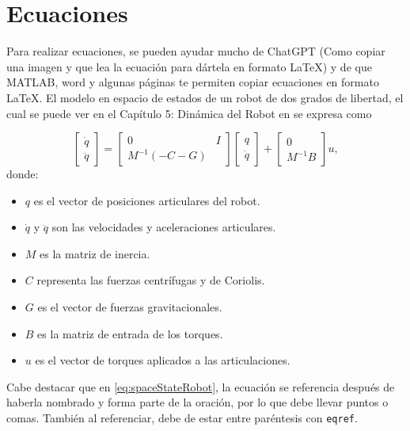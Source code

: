\section{Ecuaciones}
Para realizar ecuaciones, se pueden ayudar mucho de ChatGPT (Como copiar una imagen y que lea la ecuación para dártela en formato \LaTeX) y de que MATLAB, word y algunas páginas te permiten copiar ecuaciones en formato \LaTeX. El modelo en espacio de estados de un robot de dos grados de libertad, el cual se puede ver en el Capítulo 5: Dinámica del Robot en \cite{barrientos2007fundamentos} se expresa como

\begin{equation}
	\label{eq:spaceStateRobot}
	\begin{bmatrix}
		\dot{q} \\
		\ddot{q}
	\end{bmatrix} =
	\begin{bmatrix}
		0 & I \\
		M^{-1}(-C - G)
	\end{bmatrix}
	\begin{bmatrix}
		q \\
		\dot{q}
	\end{bmatrix} +
	\begin{bmatrix}
		0 \\
		M^{-1} B
	\end{bmatrix} u,
\end{equation}
donde:
\begin{itemize}
	\item \( q \) es el vector de posiciones articulares del robot.
	\item \( \dot{q} \) y \( \ddot{q} \) son las velocidades y aceleraciones articulares.
	\item \( M \) es la matriz de inercia.
	\item \( C \) representa las fuerzas centrífugas y de Coriolis.
	\item \( G \) es el vector de fuerzas gravitacionales.
	\item \( B \) es la matriz de entrada de los torques.
	\item \( u \) es el vector de torques aplicados a las articulaciones.
\end{itemize}

Cabe destacar que en \eqref{eq:spaceStateRobot}, la ecuación se referencia después de haberla nombrado y forma parte de la oración, por lo que debe llevar puntos o comas. También al referenciar, debe de estar entre paréntesis con \texttt{eqref}.